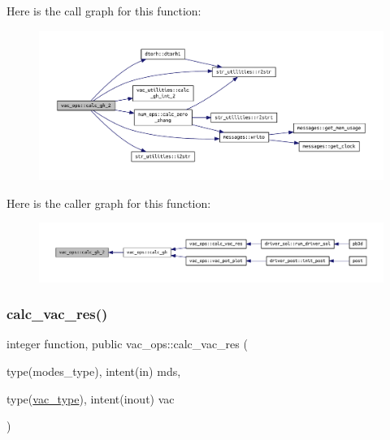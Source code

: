 Here is the call graph for this function\+:\nopagebreak
\begin{figure}[H]
\begin{center}
\leavevmode
\includegraphics[width=350pt]{namespacevac__ops_ae4987d1f48f1f83b1f0d38ea85b4998b_cgraph}
\end{center}
\end{figure}
Here is the caller graph for this function\+:\nopagebreak
\begin{figure}[H]
\begin{center}
\leavevmode
\includegraphics[width=350pt]{namespacevac__ops_ae4987d1f48f1f83b1f0d38ea85b4998b_icgraph}
\end{center}
\end{figure}
\mbox{\label{namespacevac__ops_a5e5a8322b3aa2e3704b1050426f06d9d}} 
\subsubsection{\texorpdfstring{calc\+\_\+vac\+\_\+res()}{calc\_vac\_res()}}
{\footnotesize\ttfamily integer function, public vac\+\_\+ops\+::calc\+\_\+vac\+\_\+res (\begin{DoxyParamCaption}\item[{type(modes\+\_\+type), intent(in)}]{mds,  }\item[{type(\hyperlink{structvac__vars_1_1vac__type}{vac\+\_\+type}), intent(inout)}]{vac }\end{DoxyParamCaption})}



